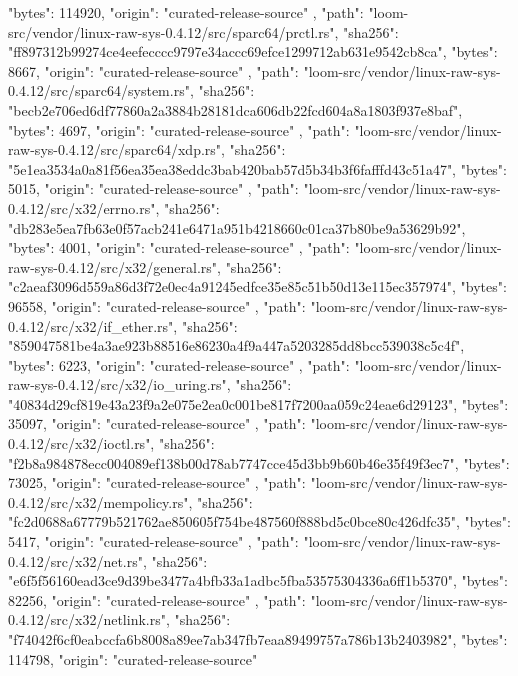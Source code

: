 {{      "bytes": 114920,
      "origin": "curated-release-source"
    },
    {
      "path": "loom-src/vendor/linux-raw-sys-0.4.12/src/sparc64/prctl.rs",
      "sha256": "ff897312b99274ce4eefecccc9797e34accc69efce1299712ab631e9542cb8ca",
      "bytes": 8667,
      "origin": "curated-release-source"
    },
    {
      "path": "loom-src/vendor/linux-raw-sys-0.4.12/src/sparc64/system.rs",
      "sha256": "becb2e706ed6df77860a2a3884b28181dca606db22fcd604a8a1803f937e8baf",
      "bytes": 4697,
      "origin": "curated-release-source"
    },
    {
      "path": "loom-src/vendor/linux-raw-sys-0.4.12/src/sparc64/xdp.rs",
      "sha256": "5e1ea3534a0a81f56ea35ea38eddc3bab420bab57d5b34b3f6fafffd43c51a47",
      "bytes": 5015,
      "origin": "curated-release-source"
    },
    {
      "path": "loom-src/vendor/linux-raw-sys-0.4.12/src/x32/errno.rs",
      "sha256": "db283e5ea7fb63e0f57acb241e6471a951b4218660c01ca37b80be9a53629b92",
      "bytes": 4001,
      "origin": "curated-release-source"
    },
    {
      "path": "loom-src/vendor/linux-raw-sys-0.4.12/src/x32/general.rs",
      "sha256": "c2aeaf3096d559a86d3f72e0ec4a91245edfce35e85c51b50d13e115ec357974",
      "bytes": 96558,
      "origin": "curated-release-source"
    },
    {
      "path": "loom-src/vendor/linux-raw-sys-0.4.12/src/x32/if_ether.rs",
      "sha256": "859047581be4a3ae923b88516e86230a4f9a447a5203285dd8bcc539038c5c4f",
      "bytes": 6223,
      "origin": "curated-release-source"
    },
    {
      "path": "loom-src/vendor/linux-raw-sys-0.4.12/src/x32/io_uring.rs",
      "sha256": "40834d29cf819e43a23f9a2e075e2ea0c001be817f7200aa059c24eae6d29123",
      "bytes": 35097,
      "origin": "curated-release-source"
    },
    {
      "path": "loom-src/vendor/linux-raw-sys-0.4.12/src/x32/ioctl.rs",
      "sha256": "f2b8a984878ecc004089ef138b00d78ab7747cce45d3bb9b60b46e35f49f3ec7",
      "bytes": 73025,
      "origin": "curated-release-source"
    },
    {
      "path": "loom-src/vendor/linux-raw-sys-0.4.12/src/x32/mempolicy.rs",
      "sha256": "fc2d0688a67779b521762ae850605f754be487560f888bd5c0bce80c426dfc35",
      "bytes": 5417,
      "origin": "curated-release-source"
    },
    {
      "path": "loom-src/vendor/linux-raw-sys-0.4.12/src/x32/net.rs",
      "sha256": "e6f5f56160ead3ce9d39be3477a4bfb33a1adbc5fba53575304336a6ff1b5370",
      "bytes": 82256,
      "origin": "curated-release-source"
    },
    {
      "path": "loom-src/vendor/linux-raw-sys-0.4.12/src/x32/netlink.rs",
      "sha256": "f74042f6cf0eabccfa6b8008a89ee7ab347fb7eaa89499757a786b13b2403982",
      "bytes": 114798,
      "origin": "curated-release-source"
}}
